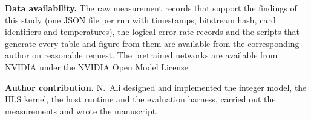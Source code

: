 \documentclass[pdflatex,sn-mathphys-num]{sn-jnl}
\begin{document}
\textbf{Data availability.} The raw measurement records that support the findings of this study (one JSON file per
run with timestamps, bitstream hash, card identifiers and temperatures), the logical error rate records and the
scripts that generate every table and figure from them are available from the corresponding author on reasonable
request. The pretrained networks are available from NVIDIA under the NVIDIA Open Model License
\cite{nvidia_fast_card,nvidia_accurate_card}.

\textbf{Author contribution.} N.~Ali designed and implemented the integer model, the HLS kernel, the host runtime
and the evaluation harness, carried out the measurements and wrote the manuscript.


\end{document}
